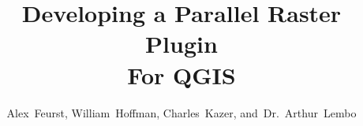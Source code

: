 \documentclass[journal]{IEEEtran}
\begin{document}
%
\title{Developing a Parallel Raster Plugin\\For QGIS}
%
%
%

\author{Alex~Feurst,
        William~Hoffman,
        Charles~Kazer,
        and~Dr.~Arthur~Lembo}%

% 
%



% 
\end{document}
